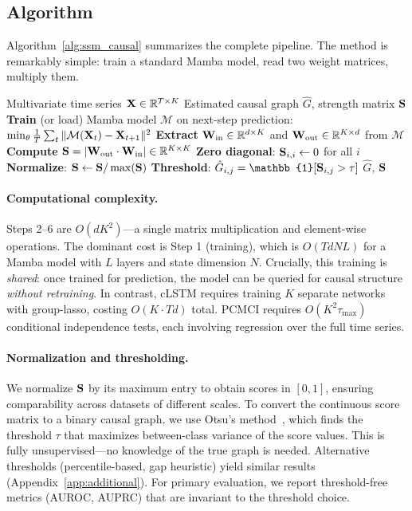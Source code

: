 \subsection{Algorithm}

Algorithm~\ref{alg:ssm_causal} summarizes the complete \methodname{}
pipeline. The method is remarkably simple: train a standard Mamba model,
read two weight matrices, multiply them.

\begin{algorithm}[t]
\caption{\methodname{}: Causal Discovery via SSM Internals}
\label{alg:ssm_causal}
\begin{algorithmic}[1]
\REQUIRE Multivariate time series $\mathbf{X} \in \mathbb{R}^{T \times K}$
\ENSURE Estimated causal graph $\hat{G}$, strength matrix $\mathbf{S}$
\STATE \textbf{Train} (or load) Mamba model $\mathcal{M}$ on next-step
       prediction: $\min_\theta \frac{1}{T}\sum_t \|\mathcal{M}(\mathbf{X}_t) -
       \mathbf{X}_{t+1}\|^2$
\STATE \textbf{Extract} $\mathbf{W}_{\text{in}} \in \mathbb{R}^{d \times K}$ and
       $\mathbf{W}_{\text{out}} \in \mathbb{R}^{K \times d}$ from $\mathcal{M}$
\STATE \textbf{Compute} $\mathbf{S} = |\mathbf{W}_{\text{out}} \cdot \mathbf{W}_{\text{in}}|
       \in \mathbb{R}^{K \times K}$
\STATE \textbf{Zero diagonal}: $\mathbf{S}_{i,i} \leftarrow 0$ for all $i$
       \hfill {}
\STATE \textbf{Normalize}: $\mathbf{S} \leftarrow \mathbf{S} / \max(\mathbf{S})$
\STATE \textbf{Threshold}: $\hat{G}_{i,j} = \mathbb{1}[\bS_{i,j} > \tau]$
       \hfill {}
\RETURN $\hat{G}$, $\mathbf{S}$
\end{algorithmic}
\end{algorithm}

\paragraph{Computational complexity.}
Steps 2--6 are $O(dK^2)$---a single matrix multiplication and
element-wise operations. The dominant cost is Step 1 (training),
which is $O(TdNL)$ for a Mamba model with $L$ layers and state
dimension $N$. Crucially, this training is \emph{shared}: once trained
for prediction, the model can be queried for causal structure
\emph{without retraining}. In contrast, cLSTM requires training $K$
separate networks with group-lasso, costing $O(K \cdot Td)$ total.
PCMCI requires $O(K^2 \tau_{\max})$ conditional independence tests,
each involving regression over the full time series.

\paragraph{Normalization and thresholding.}
We normalize $\mathbf{S}$ by its maximum entry to obtain scores in $[0, 1]$,
ensuring comparability across datasets of different scales. To convert
the continuous score matrix to a binary causal graph, we use Otsu's
method~\citep{otsu1979threshold}, which finds the threshold $\tau$ that
maximizes between-class variance of the score values. This is fully
unsupervised---no knowledge of the true graph is needed. Alternative
thresholds (percentile-based, gap heuristic) yield similar results
(Appendix~\ref{app:additional}). For primary evaluation, we report
threshold-free metrics (AUROC, AUPRC) that are invariant to the
threshold choice.

